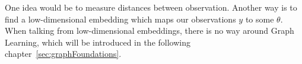 One idea would be to measure distances between observation.
Another way is to find a low-dimensional embedding which maps our observations $y$ to some $\theta$.
When talking from low-dimensional embeddings, there is no way around Graph Learning, which will be introduced
in the following chapter~\ref{sec:graphFoundations}.

